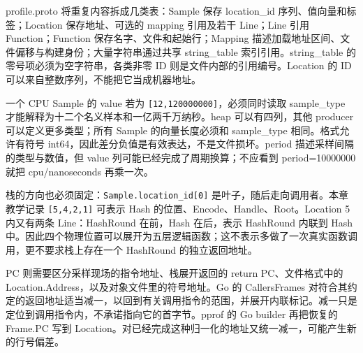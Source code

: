 \documentclass[UTF8,fontset=fandol,openany,11pt]{ctexbook}
\begin{document}
\begin{center}
\begin{minipage}{\linewidth}
\end{minipage}\end{center}

profile.proto 将重复内容拆成几类表：Sample 保存 location\_\allowbreak{}id 序列、值向量和标签；Location 保存地址、可选的 mapping 引用及若干 Line；Line 引用 Function；Function 保存名字、文件和起始行；Mapping 描述加载地址区间、文件偏移与构建身份；大量字符串通过共享 string\_\allowbreak{}table 索引引用。string\_\allowbreak{}table 的零号项必须为空字符串，各类非零 ID 则是文件内部的引用编号。Location 的 ID 可以来自整数序列，不能把它当成机器地址。\cite{pp-proto}


一个 CPU Sample 的 value 若为 \texttt{[12,\allowbreak{}120000000]}，必须同时读取 sample\_\allowbreak{}type 才能解释为十二个名义样本和一亿两千万纳秒。heap 可以有四列，其他 producer 可以定义更多类型；所有 Sample 的向量长度必须和 sample\_\allowbreak{}type 相同。格式允许有符号 int64，因此差分负值是有效表达，不是文件损坏。period 描述采样间隔的类型与数值，但 value 列可能已经完成了周期换算；不应看到 period=10000000 就把 cpu/nanoseconds 再乘一次。\cite{pp-proto}\cite{pp-cpu-builder}


栈的方向也必须固定：\texttt{Sample.\allowbreak{}location\_\allowbreak{}id[0]} 是叶子，随后走向调用者。本章教学记录 \texttt{[5,\allowbreak{}4,\allowbreak{}2,\allowbreak{}1]} 可表示 Hash 的位置、Encode、Handle、Root。Location 5 内又有两条 Line：HashRound 在前，Hash 在后，表示 HashRound 内联到 Hash 中。因此四个物理位置可以展开为五层逻辑函数；这不表示多做了一次真实函数调用，更不要求栈上存在一个 HashRound 的独立返回地址。\cite{pp-proto}\cite{pp-cpu-builder}


PC 则需要区分采样现场的指令地址、栈展开返回的 return PC、文件格式中的 Location.Address，以及对象文件里的符号地址。Go 的 CallersFrames 对符合其约定的返回地址适当减一，以回到有关调用指令的范围，并展开内联标记。减一只是定位到调用指令内，不承诺指向它的首字节。pprof 的 Go builder 再把恢复的 Frame.PC 写到 Location。对已经完成这种归一化的地址又统一减一，可能产生新的行号偏差。\cite{pp-pc}\cite{pp-cpu-builder}
\end{document}
